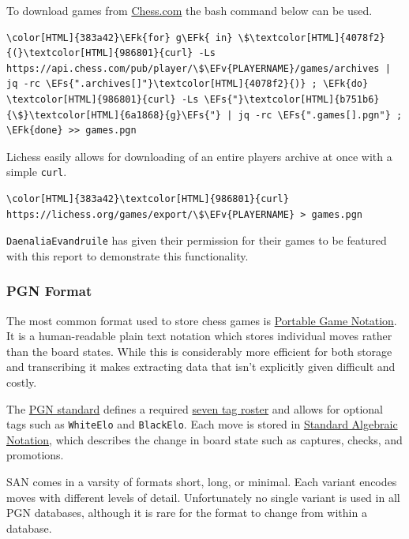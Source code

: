 \documentclass[11pt]{article}
\newcommand{\EFk}[1]{\textcolor{EFk}{#1}} %
\newcommand{\EFs}[1]{\textcolor{EFs}{#1}} %
\newcommand{\EFv}[1]{\textcolor{EFv}{#1}} %
\begin{document}
To download games from \href{https://www.chess.com/}{Chess.com} the bash command below can be used.
\begin{Code}
\begin{Verbatim}[]
\color[HTML]{383a42}\EFk{for} g\EFk{ in} \$\textcolor[HTML]{4078f2}{(}\textcolor[HTML]{986801}{curl} -Ls https://api.chess.com/pub/player/\$\EFv{PLAYERNAME}/games/archives | jq -rc \EFs{".archives[]"}\textcolor[HTML]{4078f2}{)} ; \EFk{do} \textcolor[HTML]{986801}{curl} -Ls \EFs{"}\textcolor[HTML]{b751b6}{\$}\textcolor[HTML]{6a1868}{g}\EFs{"} | jq -rc \EFs{".games[].pgn"} ; \EFk{done} >> games.pgn
\end{Verbatim}
\end{Code}

Lichess easily allows for downloading of an entire players archive at once with a simple \texttt{curl}.
\begin{Code}
\begin{Verbatim}[]
\color[HTML]{383a42}\textcolor[HTML]{986801}{curl} https://lichess.org/games/export/\$\EFv{PLAYERNAME} > games.pgn
\end{Verbatim}
\end{Code}

\texttt{DaenaliaEvandruile} has given their permission for their games to be featured with this report to demonstrate this functionality.
\subsubsection{PGN Format}
\label{sec:org4b90439}
The most common format used to store chess games is \href{https://en.wikipedia.org/wiki/Portable\_Game\_Notation}{Portable Game Notation}. It is a human-readable plain text notation which stores individual moves rather than the board states. While this is considerably more efficient for both storage and transcribing it makes extracting data that isn't explicitly given difficult and costly.

The \href{http://www.saremba.de/chessgml/standards/pgn/pgn-complete.htm}{PGN standard} defines a required \href{http://www.saremba.de/chessgml/standards/pgn/pgn-complete.htm\#c8.1.1}{seven tag roster} and allows for optional tags such as \texttt{WhiteElo} and \texttt{BlackElo}. Each move is stored in \href{https://en.wikipedia.org/wiki/Algebraic\_notation\_(chess)}{Standard Algebraic Notation}, which describes the change in board state such as captures, checks, and promotions.

SAN comes in a varsity of formats short, long, or minimal. Each variant encodes moves with different levels of detail. Unfortunately no single variant is used in all PGN databases, although it is rare for the format to change from within a database.
\end{document}
